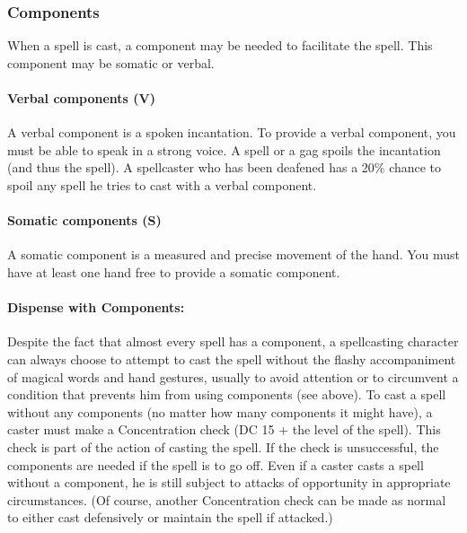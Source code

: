 \documentclass[../VancianToPsionics.tex]{subfiles}
\begin{document}
\subsubsection{Components}
\label{sec:Components}
When a spell is cast, a component may be needed to facilitate the spell. This component may be somatic or verbal.

\paragraph{Verbal components (V)} A verbal component is a spoken incantation. 
To provide a verbal component, you must be able to speak in a strong voice. 
A  spell or a gag spoils the incantation (and thus the spell). 
A spellcaster who has been deafened has a 20\% chance to spoil any spell he tries to cast with a verbal component.

\paragraph{Somatic components (S)} A somatic component is a measured and precise movement of the hand. 
You must have at least one hand free to provide a somatic component.

\paragraph{Dispense with Components:} Despite the fact that almost every spell has a component, a spellcasting character can always choose to attempt to cast the spell without the flashy accompaniment of magical words and hand gestures, usually to avoid attention or to circumvent a condition that prevents him from using components (see above). 
To cast a spell without any components (no matter how many components it might have), a caster must make a Concentration check (DC 15 + the level of the spell).
This check is part of the action of casting the spell. If the check is unsuccessful, the components are needed if the spell is to go off.
Even if a caster casts a spell without a component, he is still subject to attacks of opportunity in appropriate circumstances. 
(Of course, another Concentration check can be made as normal to either cast defensively or maintain the spell if attacked.)
\end{document}
